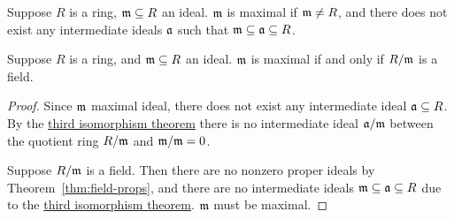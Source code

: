 \begin{definition}
    Suppose \(R\) is a ring, \(\mathfrak{m} \subseteq R\) an ideal.
    \(\mathfrak{m}\) is maximal if \(\mathfrak{m} \neq R\),
    and there does not exist any intermediate ideals \(\mathfrak{a}\)
    such that \(\mathfrak{m} \subseteq \mathfrak{a} \subseteq R\).
\end{definition}
\begin{theorem}\label{thm:maximal-quotient-field}
    Suppose \(R\) is a ring,
    and \(\mathfrak{m} \subseteq R\) an ideal.
    \(\mathfrak{m}\) is maximal if and only if \(R/\mathfrak{m}\) is a field.
\end{theorem}
\begin{proof}
    Since \(\mathfrak{m}\) maximal ideal,
    there does not exist any intermediate ideal \(\mathfrak{a} \subseteq R\).
    By the \hyperref[thm:iso-3-ring]{third isomorphism theorem}
    there is no intermediate ideal \(\mathfrak{a}/\mathfrak{m}\)
    between the quotient ring \(R/\mathfrak{m}\) and \(\mathfrak{m}/\mathfrak{m} = 0\).

    Suppose \(R/\mathfrak{m}\) is a field.
    Then there are no nonzero proper ideals by Theorem~\ref{thm:field-props},
    and there are no intermediate ideals \(\mathfrak{m} \subseteq \mathfrak{a} \subseteq R\)
    due to the \hyperref[thm:iso-3-ring]{third isomorphism theorem}.
    \(\mathfrak{m}\) must be maximal.
\end{proof}

